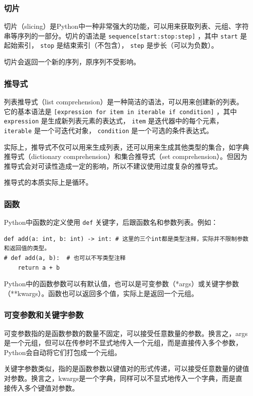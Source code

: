 \begin{frame}[fragile]
    \frametitle{切片}

    切片（slicing）是Python中一种非常强大的功能，可以用来获取列表、元组、字符串等序列的一部分。切片的语法是 \texttt{sequence[start:stop:step]} ，其中 \texttt{start} 是起始索引， \texttt{stop} 是结束索引（不包含）， \texttt{step} 是步长（可以为负数）。

    切片会返回一个新的序列，原序列不受影响。

\end{frame}

\begin{frame}
    \frametitle{推导式}

    列表推导式（list comprehension）是一种简洁的语法，可以用来创建新的列表。它的基本语法是 \texttt{[expression for item in iterable if condition]} ，其中 \texttt{expression} 是生成新列表元素的表达式， \texttt{item} 是迭代器中的每个元素， \texttt{iterable} 是一个可迭代对象， \texttt{condition} 是一个可选的条件表达式。

    实际上，推导式不仅可以用来生成列表，还可以用来生成其他类型的集合，如字典推导式（dictionary comprehension）和集合推导式（set comprehension）。但因为推导式会对可读性造成一定的影响，所以不建议使用过度复杂的推导式。

    推导式的本质实际上是循环。

\end{frame}

\begin{frame}[fragile]
    \frametitle{函数}

    Python中函数的定义使用 \texttt{def} 关键字，后跟函数名和参数列表。例如：
    \begin{verbatim}
def add(a: int, b: int) -> int: # 这里的三个int都是类型注释，实际并不限制参数和返回值的类型。
# def add(a, b):  # 也可以不写类型注释
    return a + b
    \end{verbatim}
    Python中的函数参数可以有默认值，也可以是可变参数（*args）或关键字参数（**kwargs）。函数也可以返回多个值，实际上是返回一个元组。

\end{frame}

\begin{frame}
    \frametitle{可变参数和关键字参数}

    可变参数指的是函数参数的数量不固定，可以接受任意数量的参数。换言之，args是一个元组，但可以在传参时不显式地传入一个元组，而是直接传入多个参数，Python会自动将它们打包成一个元组。
    
    关键字参数类似，指的是函数参数以键值对的形式传递，可以接受任意数量的键值对参数。换言之，kwargs是一个字典，同样可以不显式地传入一个字典，而是直接传入多个键值对参数。

\end{frame}

